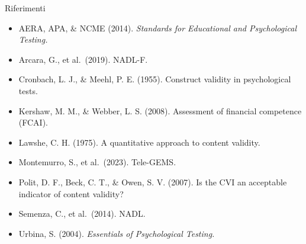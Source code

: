 \documentclass[
  ignorenonframetext,
]{beamer}
\providecommand{\tightlist}{%
  \setlength{\itemsep}{0pt}\setlength{\parskip}{0pt}}
\begin{document}
\begin{frame}{Riferimenti}
\label{riferimenti-1}
\footnotesize

\begin{itemize}
\tightlist
\item
  AERA, APA, \& NCME (2014). \emph{Standards for Educational and
  Psychological Testing.}
\item
  Arcara, G., et al.~(2019). NADL-F.
\item
  Cronbach, L. J., \& Meehl, P. E. (1955). Construct validity in
  psychological tests.
\item
  Kershaw, M. M., \& Webber, L. S. (2008). Assessment of financial
  competence (FCAI).
\item
  Lawshe, C. H. (1975). A quantitative approach to content validity.
\item
  Montemurro, S., et al.~(2023). Tele-GEMS.
\item
  Polit, D. F., Beck, C. T., \& Owen, S. V. (2007). Is the CVI an
  acceptable indicator of content validity?
\item
  Semenza, C., et al.~(2014). NADL.
\item
  Urbina, S. (2004). \emph{Essentials of Psychological Testing.}
\end{itemize}
\end{frame}
\end{document}
